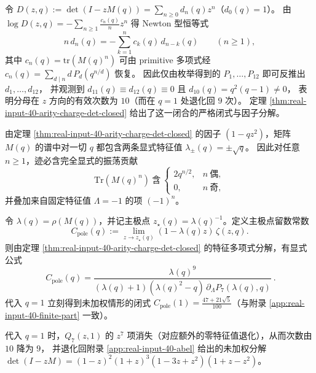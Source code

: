 \begin{remark}\label{rem:real-input-40-arity-charge-newton}
令
\(
D(z,q):=\det(I-zM(q))=\sum_{n\ge 0}d_n(q)z^n
\)（$d_0(q)=1$）。
由
\(
\log D(z,q)=-\sum_{n\ge 1}\frac{c_n(q)}{n}z^n
\)
得 Newton 型恒等式
\[
n\,d_n(q)=-\sum_{k=1}^n c_k(q)\,d_{n-k}(q)\qquad(n\ge 1),
\]
其中 $c_n(q)=\mathrm{tr}(M(q)^n)$ 可由 primitive 多项式经
\(
c_n(q)=\sum_{d\mid n} d\,P_d\!\left(q^{n/d}\right)
\)
恢复。
因此仅由枚举得到的 $P_1,\dots,P_{12}$ 即可反推出 $d_1,\dots,d_{12}$，
并观测到 $d_{11}(q)\equiv d_{12}(q)\equiv 0$ 且 $d_{10}(q)=q^2(q-1)\neq 0$，
表明分母在 $z$ 方向的有效次数为 $10$（而在 $q=1$ 处退化回 $9$ 次）。
定理 \ref{thm:real-input-40-arity-charge-det-closed} 给出了这一闭合的严格闭式与因子分解。
\end{remark}

\begin{corollary}\label{cor:real-input-40-arity-charge-sqrtq}
由定理 \ref{thm:real-input-40-arity-charge-det-closed} 的因子 $(1-qz^2)$，矩阵 $M(q)$ 的谱中对一切 $q$ 都包含两条显式特征值
\(
\lambda_\pm(q)=\pm\sqrt q
\)。
因此对任意 $n\ge 1$，迹必含完全显式的振荡贡献
\[
\mathrm{Tr}(M(q)^n)\ \text{含}\ 
\begin{cases}
2q^{n/2},&n\ \text{偶},\\
0,&n\ \text{奇},
\end{cases}
\]
并叠加来自固定特征值 $\Lambda=-1$ 的项 $(-1)^n$。
\end{corollary}

\begin{proposition}[主极点留数常数的代数闭式]\label{prop:real-input-40-arity-charge-residue}
令 $\lambda(q)=\rho(M(q))$，并记主极点 $z_\star(q)=\lambda(q)^{-1}$。定义主极点留数常数
\[
C_{\mathrm{pole}}(q):=\lim_{z\to z_\star(q)}(1-\lambda(q)z)\,\zeta(z,q).
\]
则由定理 \ref{thm:real-input-40-arity-charge-det-closed} 的特征多项式分解，有显式公式
\[
\boxed{\ 
C_{\mathrm{pole}}(q)=\frac{\lambda(q)^9}{(\lambda(q)+1)(\lambda(q)^2-q)\,\partial_\Lambda P_7(\lambda(q),q)}\ }.
\]
代入 $q=1$ 立刻得到未加权情形的闭式 $C_{\mathrm{pole}}(1)=\frac{47+21\sqrt5}{100}$（与附录 \ref{app:real-input-40-finite-part} 一致）。
\end{proposition}

\begin{remark}[在 $q=1$ 处与未加权行列式严格对接]
代入 $q=1$ 时，$Q_7(z,1)$ 的 $z^7$ 项消失（对应额外的零特征值退化），从而次数由 $10$ 降为 $9$，
并退化回附录 \ref{app:real-input-40-abel} 给出的未加权分解
\(
\det(I-zM)=(1-z)^2(1+z)^3(1-3z+z^2)(1+z-z^2)
\)。
\end{remark}

